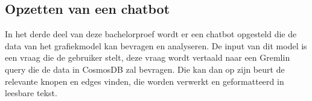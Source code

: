 \subsection{Opzetten van een chatbot}
In het derde deel van deze bachelorproef wordt er een chatbot opgesteld die de data van het grafiekmodel kan bevragen en analyseren.
De input van dit model is een vraag die de gebruiker stelt, deze vraag wordt vertaald naar een Gremlin query die de data in CosmosDB zal bevragen.
Die kan dan op zijn beurt de relevante knopen en edges vinden, die worden verwerkt en geformatteerd in leesbare tekst.



